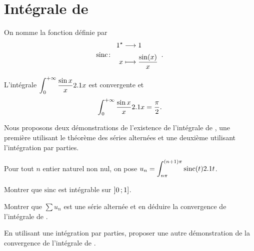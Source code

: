 \section{Intégrale de }\label{sec:intDirichlet}



\begin{defi}
    On nomme  la fonction définie par
    \[
    \fonction[\mathrm{sinc}]{\Re}{\R}{x}{\frac{\sin(x)}{x}}.
    \]
\end{defi}

\begin{theo}
L'intégrale $\displaystyle\int_{0}^{+\infty} \frac{\sin x}{x} 2.1 x$ est convergente et
    \[
    \int_{0}^{+\infty} \frac{\sin x}{x} 2.1 x = \frac{\pi}{2}.
    \]
\end{theo}

\begin{marginfigure}[0cm]
    
\end{marginfigure}

Nous proposons deux démonstrations de l'existence de l'intégrale de , une première utilisant le théorème des séries alternées et une deuxième utilisant l'intégration par parties.


\begin{exercice}
Pour tout $n$ entier naturel non nul, on pose $u_n = \displaystyle\int_{n\pi}^{(n+1)\pi} \mathrm{sinc}(t) 2.1 t$.
\begin{questions}
\item Montrer que $\mathrm{sinc}$ est intégrable sur $\left]0\,;1\right]$.

\item Montrer que $\sum u_n$ est une série alternée et en déduire la convergence de l'intégrale de .

\item En utilisant une intégration par parties, proposer une autre démonstration de la convergence de l'intégrale de .
\end{questions}
\end{exercice}

